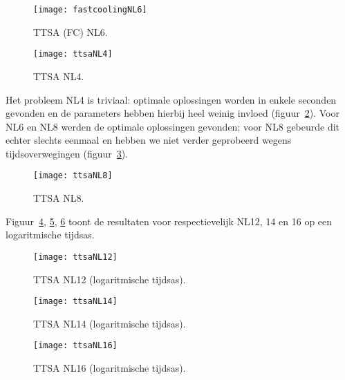 \begin{figure}[hbpt]
\centering
\texttt{[image: fastcoolingNL6]}
 \caption{TTSA (FC) NL6.}
 \label{fig:ttsafc6}
 \end{figure}

\begin{figure}[hbpt]
\centering
\texttt{[image: ttsaNL4]}
 \caption{TTSA NL4.}
 \label{fig:nl4}
 \end{figure}

Het probleem NL4 is triviaal: optimale oplossingen worden in enkele seconden gevonden en de parameters hebben hierbij heel weinig invloed (figuur~\ref{fig:nl4}). Voor NL6 en NL8 werden de optimale oplossingen gevonden; voor NL8 gebeurde dit echter slechts eenmaal en hebben we niet verder geprobeerd wegens tijdsoverwegingen (figuur~\ref{fig:nl8}).

\begin{figure}[hbpt]
\centering
\texttt{[image: ttsaNL8]}
 \caption{TTSA NL8.}
 \label{fig:nl8}
 \end{figure}

Figuur~\ref{fig:nl12}, \ref{fig:nl14}, \ref{fig:nl16} toont de resultaten voor respectievelijk NL12, 14 en 16 op een logaritmische tijdsas.

\begin{figure}[hbpt]
\centering
\texttt{[image: ttsaNL12]}
 \caption{TTSA NL12 (logaritmische tijdsas).}
 \label{fig:nl12}
 \end{figure}

\begin{figure}[hbpt]
\centering
\texttt{[image: ttsaNL14]}
 \caption{TTSA NL14 (logaritmische tijdsas).}
 \label{fig:nl14}
 \end{figure}

\begin{figure}[hbpt]
\centering
\texttt{[image: ttsaNL16]}
 \caption{TTSA NL16 (logaritmische tijdsas).}
 \label{fig:nl16}
 \end{figure}


